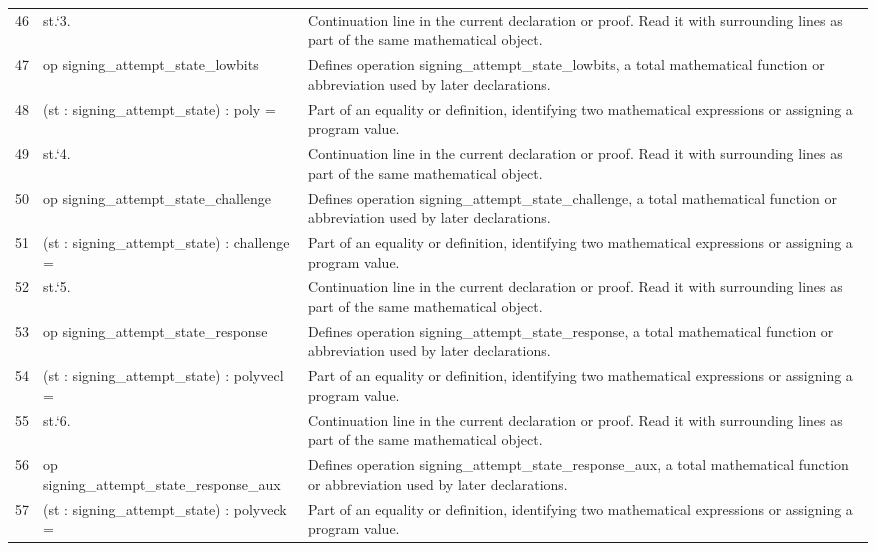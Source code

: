 \documentclass[10pt]{article}
\begin{document}
\begin{longtable}{r L{0.53\textwidth} L{0.37\textwidth}}
46 & {\ttfamily\scriptsize   st.`3.} & Continuation line in the current declaration or proof.  Read it with surrounding lines as part of the same mathematical object. \\
47 & {\ttfamily\scriptsize op signing\_attempt\_state\_lowbits} & Defines operation signing\_attempt\_state\_lowbits, a total mathematical function or abbreviation used by later declarations. \\
48 & {\ttfamily\scriptsize    (st : signing\_attempt\_state) : poly =} & Part of an equality or definition, identifying two mathematical expressions or assigning a program value. \\
49 & {\ttfamily\scriptsize   st.`4.} & Continuation line in the current declaration or proof.  Read it with surrounding lines as part of the same mathematical object. \\
50 & {\ttfamily\scriptsize op signing\_attempt\_state\_challenge} & Defines operation signing\_attempt\_state\_challenge, a total mathematical function or abbreviation used by later declarations. \\
51 & {\ttfamily\scriptsize    (st : signing\_attempt\_state) : challenge =} & Part of an equality or definition, identifying two mathematical expressions or assigning a program value. \\
52 & {\ttfamily\scriptsize   st.`5.} & Continuation line in the current declaration or proof.  Read it with surrounding lines as part of the same mathematical object. \\
53 & {\ttfamily\scriptsize op signing\_attempt\_state\_response} & Defines operation signing\_attempt\_state\_response, a total mathematical function or abbreviation used by later declarations. \\
54 & {\ttfamily\scriptsize    (st : signing\_attempt\_state) : polyvecl =} & Part of an equality or definition, identifying two mathematical expressions or assigning a program value. \\
55 & {\ttfamily\scriptsize   st.`6.} & Continuation line in the current declaration or proof.  Read it with surrounding lines as part of the same mathematical object. \\
56 & {\ttfamily\scriptsize op signing\_attempt\_state\_response\_aux} & Defines operation signing\_attempt\_state\_response\_aux, a total mathematical function or abbreviation used by later declarations. \\
57 & {\ttfamily\scriptsize    (st : signing\_attempt\_state) : polyveck =} & Part of an equality or definition, identifying two mathematical expressions or assigning a program value. \\

\end{longtable}
\end{document}
